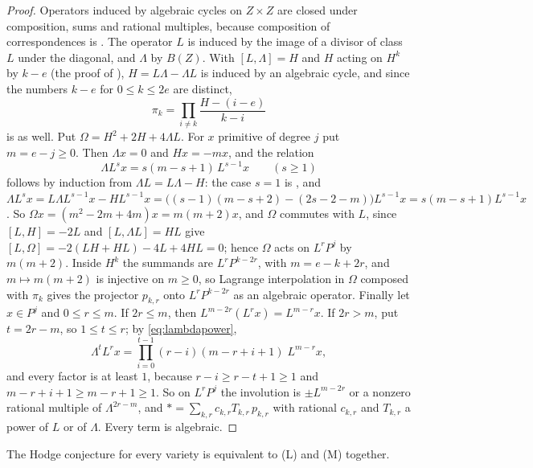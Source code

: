 \begin{proof}
Operators induced by algebraic cycles on $Z\times Z$ are closed under
composition, sums and rational multiples, because composition of
correspondences is \cite{Kle68}. The operator $L$ is induced by the image of
a divisor of class $L$ under the diagonal, and $\Lambda$ by $B(Z)$. With
$[L,\Lambda]=H$ and $H$ acting on $H^{k}$ by $k-e$ (the proof of
), $H=L\Lambda-\Lambda L$ is induced by an algebraic cycle,
and since the numbers $k-e$ for $0\le k\le 2e$ are distinct,
\[
  \pi_{k}=\prod_{i\ne k}\frac{H-(i-e)}{k-i}
\]
is as well. Put $\Omega=H^{2}+2H+4\Lambda L$. For $x$ primitive of degree
$j$ put $m=e-j\ge0$. Then $\Lambda x=0$ and $Hx=-mx$, and the relation
\begin{equation}\label{eq:lambdapower}
  \Lambda L^{s}x=s(m-s+1)\,L^{s-1}x\qquad(s\ge1)
\end{equation}
follows by induction from $\Lambda L=L\Lambda-H$: the case $s=1$ is
, and
$\Lambda L^{s}x=L\Lambda L^{s-1}x-HL^{s-1}x
=\bigl((s-1)(m-s+2)-(2s-2-m)\bigr)L^{s-1}x=s(m-s+1)L^{s-1}x$.
So $\Omega x=(m^{2}-2m+4m)x=m(m+2)x$, and $\Omega$ commutes with $L$, since
$[L,H]=-2L$ and $[L,\Lambda L]=HL$ give $[L,\Omega]=-2(LH+HL)-4L+4HL=0$;
hence $\Omega$ acts on $L^{r}P^{j}$ by $m(m+2)$. Inside $H^{k}$ the summands
are $L^{r}P^{k-2r}$, with $m=e-k+2r$, and $m\mapsto m(m+2)$ is injective on
$m\ge0$, so Lagrange interpolation in $\Omega$ composed with $\pi_{k}$ gives
the projector $p_{k,r}$ onto $L^{r}P^{k-2r}$ as an algebraic operator.
Finally let $x\in P^{j}$ and $0\le r\le m$. If $2r\le m$, then
$L^{m-2r}(L^{r}x)=L^{m-r}x$. If $2r>m$, put $t=2r-m$, so $1\le t\le r$;
by \eqref{eq:lambdapower},
\[
  \Lambda^{t}L^{r}x=\prod_{i=0}^{t-1}(r-i)(m-r+i+1)\;L^{m-r}x,
\]
and every factor is at least $1$, because $r-i\ge r-t+1\ge1$ and
$m-r+i+1\ge m-r+1\ge1$. So on $L^{r}P^{j}$ the involution is $\pm L^{m-2r}$
or a nonzero rational multiple of $\Lambda^{2r-m}$, and
${*}=\sum_{k,r}c_{k,r}T_{k,r}\,p_{k,r}$ with rational $c_{k,r}$ and
$T_{k,r}$ a power of $L$ or of $\Lambda$. Every term is algebraic.
\end{proof}

\begin{proposition}\label{prop:lefmot}
The Hodge conjecture for every variety is equivalent to \textup{(L)} and
\textup{(M)} together.
\end{proposition}

